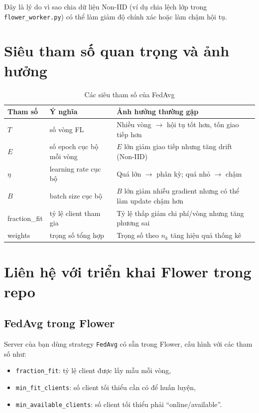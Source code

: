 \documentclass[12pt,a4paper]{article}
\begin{document}
Đây là lý do vì sao chia dữ liệu Non-IID (ví dụ chia lệch lớp trong \texttt{flower\_worker.py}) có thể làm giảm độ chính xác hoặc làm chậm hội tụ.

\section{Siêu tham số quan trọng và ảnh hưởng}

\begin{table}[h]
\centering
\begin{tabular}{@{}lll@{}}
\toprule
\textbf{Tham số} & \textbf{Ý nghĩa} & \textbf{Ảnh hưởng thường gặp} \\
\midrule
$T$ & số vòng FL & Nhiều vòng $\rightarrow$ hội tụ tốt hơn, tốn giao tiếp hơn \\
$E$ & số epoch cục bộ mỗi vòng & $E$ lớn giảm giao tiếp nhưng tăng drift (Non-IID) \\
$\eta$ & learning rate cục bộ & Quá lớn $\rightarrow$ phân kỳ; quá nhỏ $\rightarrow$ chậm \\
$B$ & batch size cục bộ & $B$ lớn giảm nhiễu gradient nhưng có thể làm update chậm hơn \\
fraction\_fit & tỷ lệ client tham gia & Tỷ lệ thấp giảm chi phí/vòng nhưng tăng phương sai \\
weights & trọng số tổng hợp & Trọng số theo $n_k$ tăng hiệu quả thống kê \\
\bottomrule
\end{tabular}
\caption{Các siêu tham số của FedAvg}
\end{table}

\section{Liên hệ với triển khai Flower trong repo}

\subsection{FedAvg trong Flower}

Server của bạn dùng strategy \texttt{FedAvg} có sẵn trong Flower, cấu hình với các tham số như:
\begin{itemize}
    \item \texttt{fraction\_fit}: tỷ lệ client được lấy mẫu mỗi vòng,
    \item \texttt{min\_fit\_clients}: số client tối thiểu cần có để huấn luyện,
    \item \texttt{min\_available\_clients}: số client tối thiểu phải ``online/available''.
\end{itemize}
\end{document}
